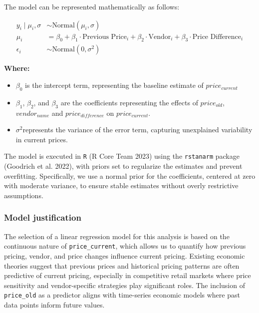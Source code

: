 \documentclass[
  letterpaper,
  DIV=11,
  numbers=noendperiod]{scrartcl}
\begin{document}
The model can be represented mathematically as follows:

\begin{align*}
    y_i \mid \mu_i, \sigma &\sim \text{Normal}(\mu_i, \sigma) \\
    \mu_i &= \beta_0 + \beta_1 \cdot \text{Previous Price}_i + \beta_2 \cdot \text{Vendor}_i + \beta_3 \cdot \text{Price Difference}_i \\
    \epsilon_i &\sim \text{Normal}(0, \sigma^2)
\end{align*}

\textbf{Where:}

\begin{itemize}
    \item $\beta_0$ is the intercept term, representing the baseline estimate of $price_{current}$
    \item $\beta_1$, $\beta_2$, and $\beta_3$ are the coefficients representing the effects of $price_{old}$, $vendor_{name}$ and $price_{difference}$ on $price_{current}$.
    \item $\sigma^2$represents the variance of the error term, capturing unexplained variability in current prices.
\end{itemize}

The model is executed in \texttt{R} (R Core Team 2023) using the
\texttt{rstanarm} package (Goodrich et al. 2022), with priors set to
regularize the estimates and prevent overfitting. Specifically, we use a
normal prior for the coefficients, centered at zero with moderate
variance, to ensure stable estimates without overly restrictive
assumptions.

\subsubsection{Model justification}\label{model-justification}

The selection of a linear regression model for this analysis is based on
the continuous nature of \texttt{price\_current}, which allows us to
quantify how previous pricing, vendor, and price changes influence
current pricing. Existing economic theories suggest that previous prices
and historical pricing patterns are often predictive of current pricing,
especially in competitive retail markets where price sensitivity and
vendor-specific strategies play significant roles. The inclusion of
\texttt{price\_old} as a predictor aligns with time-series economic
models where past data points inform future values.
\end{document}
